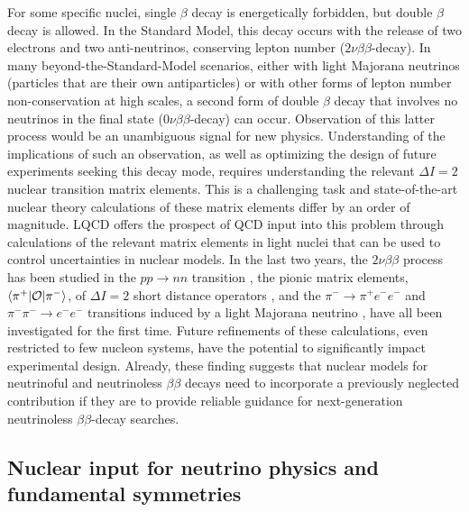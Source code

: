For some specific nuclei, single $\beta$ decay is energetically forbidden, but double $\beta$ decay is allowed. In the Standard Model, this decay occurs with the release of two electrons and two anti-neutrinos, conserving lepton number  ($2\nu\beta\beta$-decay). In many beyond-the-Standard-Model scenarios, either with light Majorana neutrinos (particles that are their own antiparticles) or with other forms of lepton number non-conservation at high scales,  a second form of  double $\beta$ decay that involves no neutrinos in the final state ($0\nu\beta\beta$-decay) can occur. Observation of this latter process would be an unambiguous signal for new physics. Understanding of the implications of such an observation, as well as optimizing the design of future experiments seeking this decay mode, requires understanding the relevant $\Delta I=2$ nuclear transition matrix elements. This is a challenging task and state-of-the-art nuclear theory calculations of these matrix elements differ by an order of magnitude. LQCD offers the prospect of QCD input into  this problem through calculations of the relevant matrix elements in light nuclei that can be used to control uncertainties in nuclear models. In the last two years, the $2\nu\beta\beta$ process has been studied in the $pp\to nn$ transition \cite{Tiburzi:2017iux,Shanahan:2017bgi}, the pionic matrix elements, $\langle \pi^+ | {\cal O} | \pi^- \rangle$, of $\Delta I =2$ short distance operators \cite{Nicholson:2018mwc}, and the $\pi^-\to \pi^+ e^- e^-$ and $\pi^-\pi^-\to e^-e^-$ transitions induced  by a light Majorana neutrino \cite{Feng:2018pdq,Detmold:2018zan}, have all been investigated for the first time. Future refinements of these calculations, even restricted to few nucleon systems, have the potential to significantly impact experimental design.  Already, these finding suggests that nuclear models for neutrinoful and neutrinoless $\beta\beta$ decays need to incorporate a previously neglected contribution if they are to provide reliable guidance for next-generation neutrinoless $\beta\beta$-decay searches. 





\subsection{Nuclear input for neutrino physics and fundamental symmetries}


